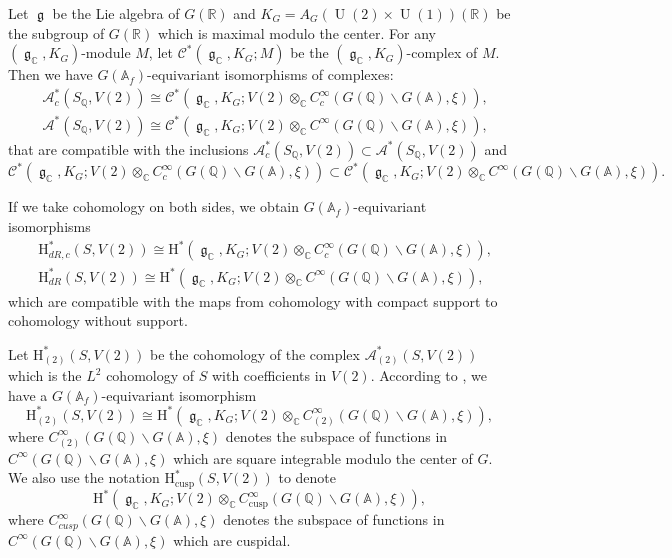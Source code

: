 \documentclass[11pt, a4paper]{amsart}
\theoremstyle{plain}
\theoremstyle{definition}
\numberwithin{equation}{section}
\def\AAA{\mathbb{A}}
\def\CC{\mathbb{C}}
\def\QQ{\mathbb{Q}}
\def\RR{\mathbb{R}}
\DeclareMathOperator{\U}{\mathrm{U}}
\DeclareMathOperator{\lieg}{\mathfrak g}
\begin{document}
Let $\lieg$ be the Lie algebra of $G(\RR)$ and $K_{G} = A_{G}(\U(2) \times \U(1))(\RR)$ be the subgroup of $G(\RR)$ which is maximal modulo the center. For any $(\lieg_{\CC}, K_{G})$-module $M$, let $\mathcal{C}^{*}(\lieg_{\CC}, K_{G}; M)$ be the $(\lieg_{\CC}, K_{G})$-complex of $M$. Then we have $G(\AAA_{f})$-equivariant isomorphisms of complexes: \cite[VII \S 2]{Borel_Wallach}
\begin{align*}
    &  \mathcal{A}^{*}_{c}(S_{\QQ}, V(2)) \cong \mathcal{C}^{*}(\lieg_{\CC}, K_{G}; V(2) \otimes_{\CC} C_{c}^{\infty}(G(\QQ) \backslash G(\AAA), \xi)), \\
    &  \mathcal{A}^{*}(S_{\QQ}, V(2)) \cong \mathcal{C}^{*}(\lieg_{\CC}, K_{G}; V(2) \otimes_{\CC} C^{\infty}(G(\QQ) \backslash G(\AAA), \xi)) ,
\end{align*}
that are compatible with the inclusions $\mathcal{A}^{*}_{c}(S_{\QQ}, V(2)) \subset \mathcal{A}^{*}(S_{\QQ}, V(2))$ and 
\begin{equation*}
  \mathcal{C}^{*}(\lieg_{\CC}, K_{G}; V(2) \otimes_{\CC} C_{c}^{\infty}(G(\QQ) \backslash G(\AAA), \xi)) \subset \mathcal{C}^{*}(\lieg_{\CC}, K_{G}; V(2) \otimes_{\CC} C^{\infty}(G(\QQ) \backslash G(\AAA), \xi)). 
\end{equation*}

If we take cohomology on both sides, we obtain $G(\AAA_{f})$-equivariant isomorphisms 
\begin{align*}
    & \mathrm{H}^{*}_{dR, c}(S, V(2)) \cong \mathrm{H}^{*}(\lieg_{\CC}, K_{G}; V(2) \otimes_{\CC} C_{c}^{\infty}(G(\QQ) \backslash G(\AAA), \xi)), \\
    & \mathrm{H}^{*}_{dR}(S, V(2)) \cong \mathrm{H}^{*}(\lieg_{\CC}, K_{G}; V(2) \otimes_{\CC} C^{\infty}(G(\QQ) \backslash G(\AAA), \xi)), 
\end{align*}
which are compatible with the maps from cohomology with compact support to cohomology without support.  
\par Let $\mathrm{H}^{*}_{(2)}(S, V(2))$ be the cohomology of the complex $\mathcal{A}^{*}_{(2)}(S, V(2))$ which 
is the $L^{2}$ cohomology of $S$ with coefficients in $V(2)$. According to \cite{Borel_regularization83}, we have a $G(\AAA_f)$-equivariant isomorphism 
\begin{equation*}
    \mathrm{H}^{*}_{(2)}(S, V(2)) \cong \mathrm{H}^{*}(\lieg_{\CC}, K_{G}; V(2) \otimes_{\CC} C_{(2)}^{\infty}(G(\QQ) \backslash G(\AAA), \xi)), 
\end{equation*}
where $C_{(2)}^{\infty}(G(\QQ) \backslash G(\AAA), \xi)$ denotes the subspace of functions in $C^{\infty}(G(\QQ) \backslash G(\AAA), \xi)$ which are square integrable modulo the center of $G$.
We also use the notation $\mathrm{H}^{*}_{\text{cusp}}(S, V(2))$ to denote 
\begin{equation*}
     \mathrm{H}^{*}(\lieg_{\CC}, K_{G}; V(2) \otimes_{\CC} C_{\text{cusp}}^{\infty}(G(\QQ) \backslash G(\AAA), \xi)), 
\end{equation*}
where $C_{cusp}^{\infty}(G(\QQ) \backslash G(\AAA), \xi)$ denotes the subspace of functions in $C^{\infty}(G(\QQ) \backslash G(\AAA), \xi)$ which are cuspidal. 
\end{document}
